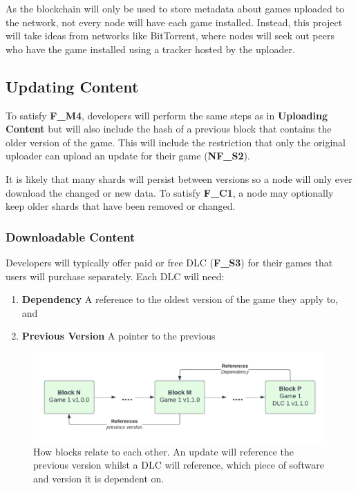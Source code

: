 \vspace{2mm}\noindent As the blockchain will only be used to store metadata about games uploaded to the network, not every node will have each game installed. Instead, this project will take ideas from networks like BitTorrent, where nodes will seek out peers who have the game installed using a tracker hosted by the uploader.

\subsection*{Updating Content}

To satisfy \textbf{F\_M4}, developers will perform the same steps as in \textbf{Uploading Content} but will also include the hash of a previous block that contains the older version of the game. This will include the restriction that only the original uploader can upload an update for their game (\textbf{NF\_S2}).

\vspace{2mm}\noindent It is likely that many shards will persist between versions so a node will only ever download the changed or new data. To satisfy \textbf{F\_C1}, a node may optionally keep older shards that have been removed or changed.

\subsubsection*{Downloadable Content}

Developers will typically offer paid or free DLC (\textbf{F\_S3}) for their games that users will purchase separately. Each DLC will need:

\begin{enumerate}
  \item \textbf{Dependency} A reference to the oldest version of the game they apply to, and
  \item \textbf{Previous Version} A pointer to the previous
\end{enumerate}


\begin{figure}[ht]
  \centering
  \includegraphics[width=.85\textwidth]{assets/images/diagrams/software.png}
  \caption{How blocks relate to each other. An update will reference the previous version whilst a DLC will reference, which piece of software and version it is dependent on.}
\end{figure}

